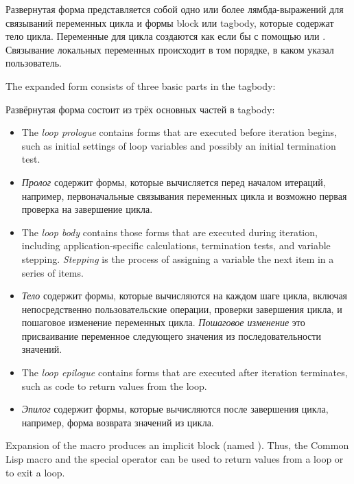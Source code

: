 Развернутая форма представляется собой одно или более лямбда-выражений
для связываний переменных цикла и формы block или tagbody, которые
содержат тело цикла. Переменные для цикла создаются как если бы с
помощью  или . Связывание локальных переменных
происходит в том порядке, в каком указал пользователь.

The expanded form consists of three basic parts in the tagbody:

Развёрнутая форма состоит из трёх основных частей в tagbody:

\begin{itemize}
\item
The \emph{loop prologue\/} contains forms that are executed before iteration begins, 
such as initial settings of loop variables and possibly an initial
termination test.

\item \emph{Пролог} содержит формы, которые вычисляется перед началом
  итераций, например, первоначальные связывания переменных цикла и
  возможно первая проверка на завершение цикла.

\item
The \emph{loop body\/}  contains those forms that are executed during iteration, 
including application-specific calculations, termination tests,
and variable stepping.  \emph{Stepping\/} is the process of assigning a
variable the next item in a series of items.

\item \emph{Тело} содержит формы, которые вычисляются на каждом шаге
  цикла, включая непосредственно пользовательские операции, проверки
  завершения цикла, и пошаговое изменение переменных
  цикла. \emph{Пошаговое изменение} это присваивание переменное
  следующего значения из последовательности значений.

\item
The \emph{loop epilogue} contains forms that are executed after iteration 
terminates,
such as code to return values from the loop.

\item \emph{Эпилог} содержит формы, которые вычисляются после
  завершения цикла, например, форма возврата значений из цикла.
\end{itemize}

Expansion of the  macro produces an implicit block 
(named ).
Thus, the Common Lisp macro  and the special operator 
 can be 
used to return values from a loop or to exit a loop.

